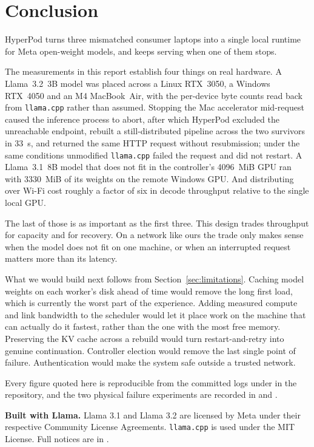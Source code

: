 \section{Conclusion}

HyperPod turns three mismatched consumer laptops into a single local runtime for
Meta open-weight models, and keeps serving when one of them stops.

The measurements in this report establish four things on real hardware. A
Llama~3.2~3B model was placed across a Linux RTX~3050, a Windows RTX~4050 and an
M4 MacBook~Air, with the per-device byte counts read back from
\texttt{llama.cpp} rather than assumed. Stopping the Mac accelerator mid-request
caused the inference process to abort, after which HyperPod excluded the
unreachable endpoint, rebuilt a still-distributed pipeline across the two
survivors in \SI{33}{\second}, and returned the same HTTP request without
resubmission; under the same conditions unmodified \texttt{llama.cpp} failed the
request and did not restart. A Llama~3.1~8B model that does not fit in the
controller's \SI{4096}{MiB} GPU ran with \SI{3330}{MiB} of its weights on the
remote Windows GPU. And distributing over Wi-Fi cost roughly a factor of six in
decode throughput relative to the single local GPU.

The last of those is as important as the first three. This design trades
throughput for capacity and for recovery. On a network like ours the trade only
makes sense when the model does not fit on one machine, or when an interrupted
request matters more than its latency.

What we would build next follows from Section~\ref{sec:limitations}. Caching
model weights on each worker's disk ahead of time would remove the long first
load, which is currently the worst part of the experience. Adding measured
compute and link bandwidth to the scheduler would let it place work on the
machine that can actually do it fastest, rather than the one with the most free
memory. Preserving the KV cache across a rebuild would turn restart-and-retry
into genuine continuation. Controller election would remove the last single
point of failure. Authentication would make the system safe outside a trusted
network.

Every figure quoted here is reproducible from the committed logs under
 in the repository, and the two physical failure experiments are
recorded in  and
.

\vspace{1em}
\noindent\textbf{Built with Llama.} Llama 3.1 and Llama 3.2 are licensed by Meta
under their respective Community License Agreements. \texttt{llama.cpp} is used
under the MIT License. Full notices are in .
